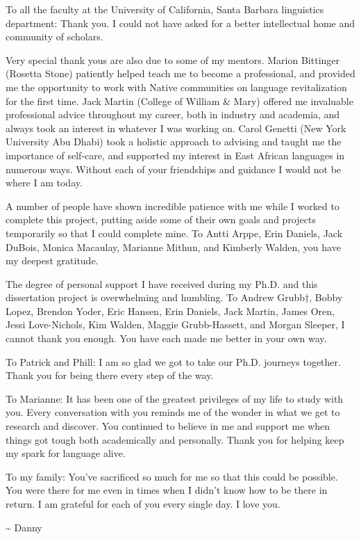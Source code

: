 To all the faculty at the University of California, Santa Barbara linguistics department: Thank you. I could not have asked for a better intellectual home and community of scholars.

Very special thank yous are also due to some of my mentors. Marion Bittinger (Rosetta Stone) patiently helped teach me to become a professional, and provided me the opportunity to work with Native communities on language revitalization for the first time. Jack Martin (College of William \& Mary) offered me invaluable professional advice throughout my career, both in industry and academia, and always took an interest in whatever I was working on. Carol Genetti (New York University Abu Dhabi) took a holistic approach to advising and taught me the importance of self-care, and supported my interest in East African languages in numerous ways. Without each of your friendships and guidance I would not be where I am today.

A number of people have shown incredible patience with me while I worked to complete this project, putting aside some of their own goals and projects temporarily so that I could complete mine. To Antti Arppe, Erin Daniels, Jack DuBois, Monica Macaulay, Marianne Mithun, and Kimberly Walden, you have my deepest gratitude.

The degree of personal support I have received during my Ph.D. and this dissertation project is overwhelming and humbling. To Andrew Grubb†, Bobby Lopez, Brendon Yoder, Eric Hansen, Erin Daniels, Jack Martin, James Oren, Jessi Love-Nichols, Kim Walden, Maggie Grubb-Hassett, and Morgan Sleeper, I cannot thank you enough. You have each made me better in your own way.

To Patrick and Phill: I am so glad we got to take our Ph.D. journeys together. Thank you for being there every step of the way.

To Marianne: It has been one of the greatest privileges of my life to study with you. Every conversation with you reminds me of the wonder in what we get to research and discover. You continued to believe in me and support me when things got tough both academically and personally. Thank you for helping keep my spark for language alive.

To my family: You've sacrificed so much for me so that this could be possible. You were there for me even in times when I didn't know how to be there in return. I am grateful for each of you every single day. I love you.

\hfill\textasciitilde{ }Danny

\doublespacing
